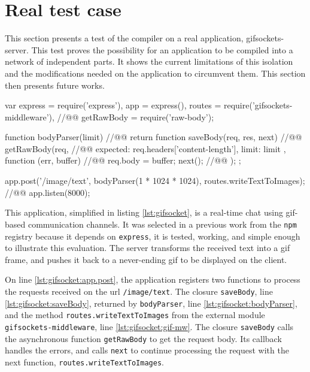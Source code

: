\section{Real test case} \label{section:evaluation}

This section presents a test of the compiler on a real application, gifsockets-server.
This test proves the possibility for an application to be compiled into a network of independent parts.
It shows the current limitations of this isolation and the modifications needed on the application to circumvent them.
This section then presents future works.

\begin{code}[js, caption={Simplified version of gifsockets-server},label={lst:gifsocket}]
var express = require('express'),
    app = express(),
    routes = require('gifsockets-middleware'), //@\label{lst:gifsocket:gif-mw}@
    getRawBody = require('raw-body');

function bodyParser(limit) { //@\label{lst:gifsocket:bodyParser}@
  return function saveBody(req, res, next) { //@\label{lst:gifsocket:saveBody}@
    getRawBody(req, { //@\label{lst:gifsocket:getRawBody}@
      expected: req.headers['content-length'],
      limit: limit
    }, function (err, buffer) { //@\label{lst:gifsocket:callback}@
      req.body = buffer;
      next(); //@\label{lst:gifsocket:next}@
    });
  };
}

app.post('/image/text', bodyParser(1 * 1024 * 1024), routes.writeTextToImages); //@\label{lst:gifsocket:app.post}@
app.listen(8000);
\end{code}

This application, simplified in listing \ref{lst:gifsocket}, is a real-time chat using gif-based communication channels.
It was selected in a previous work \cite{Brodu2015} from the \texttt{npm} registry because it depends on \texttt{express}, it is tested, working, and simple enough to illustrate this evaluation.
The server transforms the received text into a gif frame, and pushes it back to a never-ending gif to be displayed on the client.

On line \ref{lst:gifsocket:app.post}, the application registers two functions to process the requests received on the url \texttt{/image/text}.
The closure \texttt{saveBody}, line \ref{lst:gifsocket:saveBody}, returned by \texttt{bodyParser}, line \ref{lst:gifsocket:bodyParser}, and the method \texttt{routes.write\-Text\-To\-Images} from the external module \texttt{gifsockets-middleware}, line \ref{lst:gifsocket:gif-mw}.
The closure \texttt{saveBody} calls the asynchronous function \texttt{getRawBody} to get the request body.
Its callback handles the errors, and calls \texttt{next} to continue processing the request with the next function, \texttt{routes.write\-Text\-To\-Images}.


